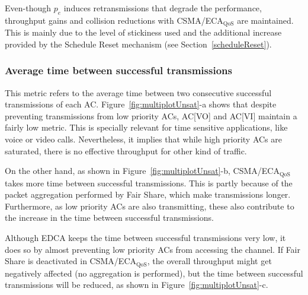 \begin{itemize}
Even-though $p_e$ induces retransmissions that degrade the performance, throughput gains and collision reductions with CSMA/ECA$_{\text{QoS}}$ are maintained. This is mainly due to the level of stickiness used and the additional increase provided by the Schedule Reset mechanism (see Section~\ref{scheduleReset}).


%

\end{itemize}

\subsubsection{Average time between successful transmissions}
This metric refers to the average time between two consecutive successful transmissions of each AC. Figure~\ref{fig:multiplotUnsat}-a shows that despite preventing transmissions from low priority ACs, AC[VO] and AC[VI] maintain a fairly low metric. This is specially relevant for time sensitive applications, like voice or video calls. Nevertheless, it implies that while high priority ACs are saturated, there is no effective throughput for other kind of traffic.

On the other hand, as shown in Figure~\ref{fig:multiplotUnsat}-b, CSMA/ECA$_{\text{QoS}}$ takes more time between successful transmissions. This is partly because of the packet aggregation performed by Fair Share, which make transmissions longer. Furthermore, as low priority ACs are also transmitting, these also contribute to the increase in the time between successful transmissions. 

Although EDCA keeps the time between successful transmissions very low, it does so by almost preventing low priority ACs from accessing the channel. If Fair Share is deactivated in CSMA/ECA$_{\text{QoS}}$, the overall throughput might get negatively affected (no aggregation is performed), but the time between successful transmissions will be reduced, as shown in Figure~\ref{fig:multiplotUnsat}-c.

